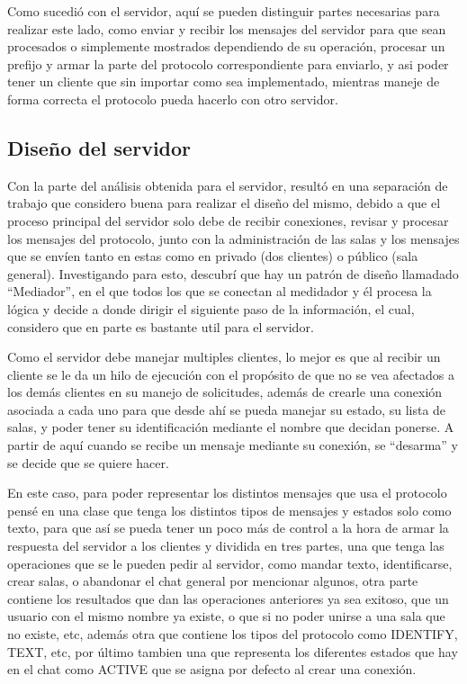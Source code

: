 \documentclass[12pt,letterpaper]{article}
\begin{document}
Como sucedió con el servidor, aquí se pueden distinguir partes necesarias para realizar este lado, como enviar y recibir los mensajes del servidor para que sean procesados o simplemente mostrados dependiendo de su operación, procesar un prefijo y armar la parte del protocolo correspondiente para enviarlo, y asi poder tener un cliente que sin importar como sea implementado, mientras maneje de forma correcta el protocolo pueda hacerlo con otro servidor.



\newpage
\subsection*{Diseño del servidor}
Con la parte del análisis obtenida para el servidor, resultó en una separación de trabajo que considero buena para realizar el diseño del mismo, debido a que el proceso principal del servidor solo debe de recibir conexiones, revisar y procesar los mensajes del protocolo, junto con la administración de las salas y los mensajes que se envíen tanto en estas como en privado (dos clientes) o público (sala general). Investigando para esto, descubrí que hay un patrón de diseño llamadado ``Mediador'', en el que todos los que se conectan al medidador y él procesa la lógica y decide a donde dirigir el siguiente paso de la información, el cual, considero que en parte es bastante util para el servidor.

Como el servidor debe manejar multiples clientes, lo mejor es que al recibir un cliente se le da un hilo de ejecución con el propósito de que no se vea afectados a los demás clientes en su manejo de solicitudes, además de crearle una conexión asociada a cada uno para que desde ahí se pueda manejar su estado, su lista de salas, y poder tener su identificación mediante el nombre que decidan ponerse. A partir de aquí cuando se recibe un mensaje mediante su conexión, se ``desarma'' y se decide que se quiere hacer.

En este caso, para poder representar los distintos mensajes que usa el protocolo pensé en una clase que tenga los distintos tipos de mensajes y estados solo como texto, para que así se pueda tener un poco más de control a la hora de armar la respuesta del servidor a los clientes y dividida en tres partes, una que tenga las operaciones que se le pueden pedir al servidor, como mandar texto, identificarse, crear salas, o abandonar el chat general por mencionar algunos, otra parte contiene los resultados que dan las operaciones anteriores ya sea exitoso, que un usuario con el mismo nombre ya existe, o que si no poder unirse a una sala que no existe, etc, además otra que contiene los tipos del protocolo como IDENTIFY, TEXT, etc, por último tambien una que representa los diferentes estados que hay en el chat como ACTIVE que se asigna por defecto al crear una conexión.
\end{document}
